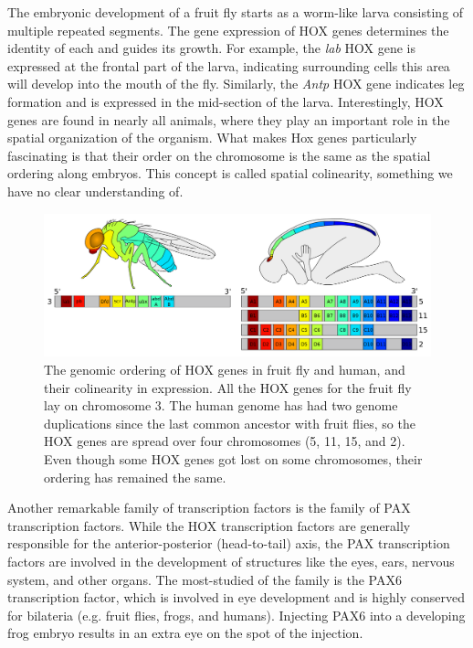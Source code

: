 The embryonic development of a fruit fly starts as a worm-like larva consisting of multiple repeated segments. The gene expression of HOX genes determines the identity of each and guides its growth. For example, the \textit{lab} HOX gene is expressed at the frontal part of the larva, indicating surrounding cells this area will develop into the mouth of the fly\cite{Hughes2002}. Similarly, the \textit{Antp} HOX gene indicates leg formation and is expressed in the mid-section of the larva. Interestingly, HOX genes are found in nearly all animals, where they play an important role in the spatial organization of the organism. What makes Hox genes particularly fascinating is that their order on the chromosome is the same as the spatial ordering along embryos. This concept is called spatial colinearity, something we have no clear understanding of\cite{Gaunt2015}.

\begin{figure}
    \center
    \includegraphics[width=\linewidth]{ch.introduction/imgs/hox.png}
    \caption{The genomic ordering of HOX genes in fruit fly and human, and their colinearity in expression. All the HOX genes for the fruit fly lay on chromosome 3. The human genome has had two genome duplications since the last common ancestor with fruit flies, so the HOX genes are spread over four chromosomes (5, 11, 15, and 2). Even though some HOX genes got lost on some chromosomes, their ordering has remained the same.}
    \label{fig:hox}
\end{figure}

Another remarkable family of transcription factors is the family of PAX transcription factors. While the HOX transcription factors are generally responsible for the anterior-posterior (head-to-tail) axis, the PAX transcription factors are involved in the development of structures like the eyes, ears, nervous system, and other organs. The most-studied of the family is the PAX6 transcription factor, which is involved in eye development and is highly conserved for bilateria (e.g. fruit flies, frogs, and humans). Injecting PAX6 into a developing frog embryo results in an extra eye on the spot of the injection\cite{Chow1999}.

